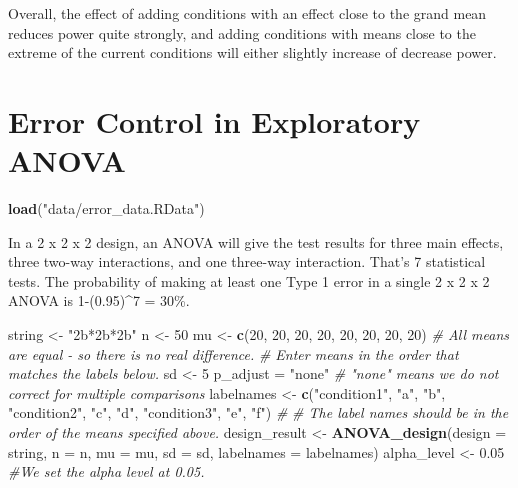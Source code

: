 \documentclass[]{book}
\newenvironment{Shaded}{\begin{snugshade}}{\end{snugshade}}
\newcommand{\CommentTok}[1]{\textcolor[rgb]{0.56,0.35,0.01}{\textit{#1}}}
\newcommand{\DataTypeTok}[1]{\textcolor[rgb]{0.13,0.29,0.53}{#1}}
\newcommand{\DecValTok}[1]{\textcolor[rgb]{0.00,0.00,0.81}{#1}}
\newcommand{\FloatTok}[1]{\textcolor[rgb]{0.00,0.00,0.81}{#1}}
\newcommand{\KeywordTok}[1]{\textcolor[rgb]{0.13,0.29,0.53}{\textbf{#1}}}
\newcommand{\NormalTok}[1]{#1}
\newcommand{\StringTok}[1]{\textcolor[rgb]{0.31,0.60,0.02}{#1}}
\begin{document}
Overall, the effect of adding conditions with an effect close to the grand mean reduces power quite strongly, and adding conditions with means close to the extreme of the current conditions will either slightly increase of decrease power.

\hypertarget{error-control-in-exploratory-anova}{%
\chapter{Error Control in Exploratory ANOVA}\label{error-control-in-exploratory-anova}}

\begin{Shaded}
\begin{Highlighting}[]
\KeywordTok{load}\NormalTok{(}\StringTok{"data/error_data.RData"}\NormalTok{)}
\end{Highlighting}
\end{Shaded}

In a 2 x 2 x 2 design, an ANOVA will give the test results for three main effects, three two-way interactions, and one three-way interaction. That's 7 statistical tests. The probability of making at least one Type 1 error in a single 2 x 2 x 2 ANOVA is 1-(0.95)\^{}7 = 30\%.

\begin{Shaded}
\begin{Highlighting}[]
\NormalTok{string <-}\StringTok{ "2b*2b*2b"}
\NormalTok{n <-}\StringTok{ }\DecValTok{50}
\NormalTok{mu <-}\StringTok{ }\KeywordTok{c}\NormalTok{(}\DecValTok{20}\NormalTok{, }\DecValTok{20}\NormalTok{, }\DecValTok{20}\NormalTok{, }\DecValTok{20}\NormalTok{, }\DecValTok{20}\NormalTok{, }\DecValTok{20}\NormalTok{, }\DecValTok{20}\NormalTok{, }\DecValTok{20}\NormalTok{) }
\CommentTok{# All means are equal - so there is no real difference.}
\CommentTok{# Enter means in the order that matches the labels below.}
\NormalTok{sd <-}\StringTok{ }\DecValTok{5}
\NormalTok{p_adjust =}\StringTok{ "none"}
\CommentTok{# "none" means we do not correct for multiple comparisons}
\NormalTok{labelnames <-}\StringTok{ }\KeywordTok{c}\NormalTok{(}\StringTok{"condition1"}\NormalTok{, }\StringTok{"a"}\NormalTok{, }\StringTok{"b"}\NormalTok{, }
                \StringTok{"condition2"}\NormalTok{, }\StringTok{"c"}\NormalTok{, }\StringTok{"d"}\NormalTok{, }
                \StringTok{"condition3"}\NormalTok{, }\StringTok{"e"}\NormalTok{, }\StringTok{"f"}\NormalTok{) }\CommentTok{#}
\CommentTok{# The label names should be in the order of the means specified above.}
\NormalTok{design_result <-}\StringTok{ }\KeywordTok{ANOVA_design}\NormalTok{(}\DataTypeTok{design =}\NormalTok{ string,}
                   \DataTypeTok{n =}\NormalTok{ n, }
                   \DataTypeTok{mu =}\NormalTok{ mu, }
                   \DataTypeTok{sd =}\NormalTok{ sd, }
                   \DataTypeTok{labelnames =}\NormalTok{ labelnames)}
\NormalTok{alpha_level <-}\StringTok{ }\FloatTok{0.05}
\CommentTok{#We set the alpha level at 0.05. }
\end{Highlighting}
\end{Shaded}
\end{document}

